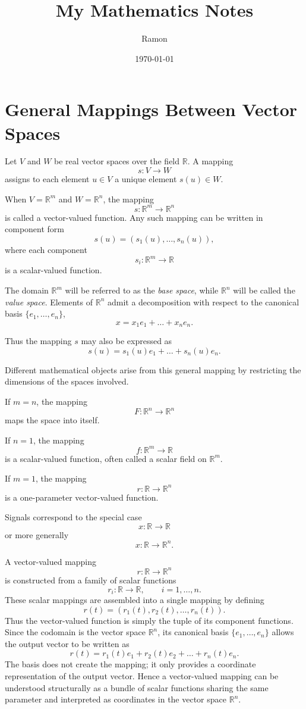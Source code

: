 \documentclass{article}
\begin{document}
	
	\title{My Mathematics Notes}
	\author{Ramon}
	\date{\today}
	
	\maketitle
	\section{General Mappings Between Vector Spaces}
	
	Let $V$ and $W$ be real vector spaces over the field $\mathbb{R}$.
	A mapping
	\[
	s : V \to W
	\]
	assigns to each element $u \in V$ a unique element $s(u) \in W$.
	
	When $V = \mathbb{R}^m$ and $W = \mathbb{R}^n$, the mapping
	\[
	s : \mathbb{R}^m \to \mathbb{R}^n
	\]
	is called a vector-valued function. Any such mapping can be written in component form
	\[
	s(u) = (s_1(u), \dots, s_n(u)),
	\]
	where each component
	\[
	s_i : \mathbb{R}^m \to \mathbb{R}
	\]
	is a scalar-valued function.
	
	The domain $\mathbb{R}^m$ will be referred to as the \emph{base space}, while $\mathbb{R}^n$ will be called the \emph{value space}. Elements of $\mathbb{R}^n$ admit a decomposition with respect to the canonical basis $\{e_1,\dots,e_n\}$,
	\[
	x = x_1 e_1 + \dots + x_n e_n.
	\]
	
	Thus the mapping $s$ may also be expressed as
	\[
	s(u) = s_1(u)e_1 + \dots + s_n(u)e_n.
	\]
	
	Different mathematical objects arise from this general mapping by restricting the dimensions of the spaces involved.
	
	If $m = n$, the mapping
	\[
	F : \mathbb{R}^n \to \mathbb{R}^n
	\]
	maps the space into itself.
	
	If $n = 1$, the mapping
	\[
	f : \mathbb{R}^m \to \mathbb{R}
	\]
	is a scalar-valued function, often called a scalar field on $\mathbb{R}^m$.
	
	If $m = 1$, the mapping
	\[
	r : \mathbb{R} \to \mathbb{R}^n
	\]
	is a one-parameter vector-valued function.
	
	Signals correspond to the special case
	\[
	x : \mathbb{R} \to \mathbb{R}
	\]
	or more generally
	\[
	x : \mathbb{R} \to \mathbb{R}^n.
	\]
	
	A vector-valued mapping
	\[
	r : \mathbb{R} \to \mathbb{R}^n
	\]
	is constructed from a family of scalar functions
	\[
	r_i : \mathbb{R} \to \mathbb{R}, \qquad i=1,\dots,n.
	\]
	These scalar mappings are assembled into a single mapping by defining
	\[
	r(t) = (r_1(t), r_2(t), \dots, r_n(t)).
	\]
	Thus the vector-valued function is simply the tuple of its component functions. Since the codomain is the vector space $\mathbb{R}^n$, its canonical basis $\{e_1,\dots,e_n\}$ allows the output vector to be written as
	\[
	r(t) = r_1(t)e_1 + r_2(t)e_2 + \dots + r_n(t)e_n.
	\]
	The basis does not create the mapping; it only provides a coordinate representation of the output vector. Hence a vector-valued mapping can be understood structurally as a bundle of scalar functions sharing the same parameter and interpreted as coordinates in the vector space $\mathbb{R}^n$.
	
\end{document}
